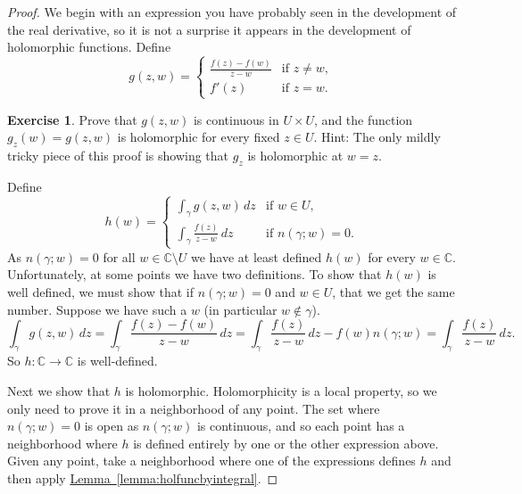 \documentclass[12pt,openany]{book}
\newcommand{\C}{{\mathbb{C}}}
\theoremstyle{plain}
\theoremstyle{remark}
\theoremstyle{definition}
\newenvironment{exbox}{%
    \def\FrameCommand{\vrule width 1pt \relax\hspace {10pt}}%
    \MakeFramed {\advance \hsize -\width \FrameRestore }%
}{%
    \endMakeFramed
}
\theoremstyle{exercise}
\newtheorem{exercise}{Exercise}[section]
\theoremstyle{example}
\newcommand{\thmref}[1]{\hyperref[#1]{Theorem~\ref*{#1}}}
\newcommand{\lemmaref}[1]{\hyperref[#1]{Lemma~\ref*{#1}}}
\begin{document}
\begin{proof}
We begin with an expression you have probably seen in the development of the real
derivative, so it is not a surprise it appears in the development of
holomorphic functions.
Define
\begin{equation*}
g(z,w) =
\begin{cases}
\frac{f(z)-f(w)}{z-w} & \text{if } z \not= w , \\
f'(z)                 & \text{if } z = w .
\end{cases}
\end{equation*}

\begin{exbox}
\begin{exercise}
Prove that $g(z,w)$ is continuous in $U \times U$, and 
the function $g_z(w) = g(z,w)$ is holomorphic for every fixed $z \in U$.
Hint: The only mildly tricky piece of this proof is showing that $g_z$ is
holomorphic at $w=z$.
\end{exercise}
\end{exbox}

Define
\begin{equation*}
h(w) = 
\begin{cases}
\int_\gamma g(z,w) \, dz & \text{if } w \in U , \\
\int_\gamma \frac{f(z)}{z-w} \, dz & \text{if } n(\gamma;w) = 0 .
\end{cases}
\end{equation*}
As $n(\gamma;w) = 0$ for all $w \in \C \setminus U$ we have at least
defined $h(w)$ for every $w \in \C$.  Unfortunately, at some points
we have two definitions.
To show that $h(w)$ is well defined, we must show that if
$n(\gamma;w) = 0$ and $w \in U$, that we get the same number.
Suppose
we have such a $w$ (in particular $w \notin \gamma$).
\begin{equation*}
\int_\gamma g(z,w) \, dz
=
\int_\gamma \frac{f(z)-f(w)}{z-w} \, dz
=
\int_\gamma \frac{f(z)}{z-w} \, dz
-
f(w) n(\gamma;w)
=
\int_\gamma \frac{f(z)}{z-w} \, dz .
\end{equation*}
So $h \colon \C \to \C$ is well-defined.

Next we show that $h$ is
holomorphic.
Holomorphicity is a local property, so we only need to prove it 
in a neighborhood of any point.
The set where $n(\gamma;w) = 0$ is open as $n(\gamma;w)$ is
continuous, and so each point has a neighborhood where $h$ is defined
entirely by one or the other expression above.  Given any point,
take a neighborhood where one of the expressions defines
$h$ and then apply \lemmaref{lemma:holfuncbyintegral}.


\end{proof}
\end{document}
